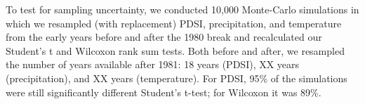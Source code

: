 \documentclass[final]{nature}
\begin{document}
\indent To test for sampling uncertainty, we conducted 10,000 Monte-Carlo simulations in which we resampled (with replacement) PDSI, precipitation, and temperature from the early years before and after the 1980 break and recalculated our Student's t and Wilcoxon rank sum tests. Both before and after, we resampled the number of years available after 1981: 18 years (PDSI), XX years (precipitation), and XX years (temperature). For PDSI, 95\% of the simulations were still significantly different Student's t-test; for Wilcoxon it was 89\%.

\end{document}
